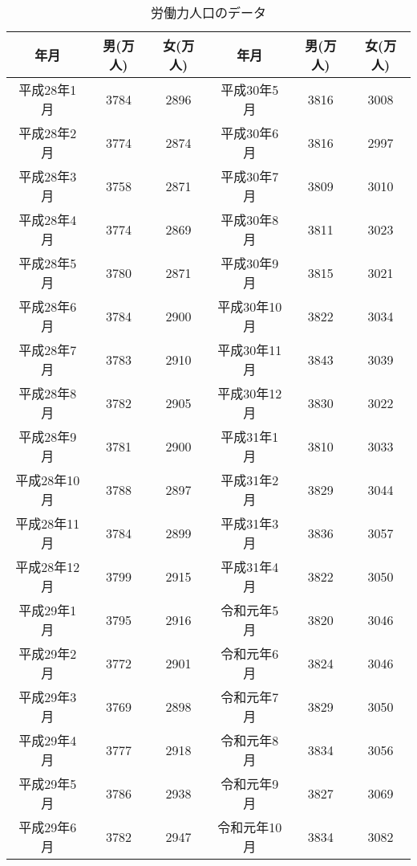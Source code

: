 \documentclass[12pt]{jarticle}
\begin{document}
\clearpage
\begin{table}[htb]
    \begin{center}
        \caption{労働力人口のデータ}
        \begin{tabular}{|c|c|c||c|c|c|} \hline
            年月         & 男(万人) & 女(万人) & 年月         & 男(万人) & 女(万人) \\\hline
            平成28年1月  & 3784     & 2896     & 平成30年5月  & 3816     & 3008     \\
            平成28年2月  & 3774     & 2874     & 平成30年6月  & 3816     & 2997     \\
            平成28年3月  & 3758     & 2871     & 平成30年7月  & 3809     & 3010     \\
            平成28年4月  & 3774     & 2869     & 平成30年8月  & 3811     & 3023     \\
            平成28年5月  & 3780     & 2871     & 平成30年9月  & 3815     & 3021     \\
            平成28年6月  & 3784     & 2900     & 平成30年10月 & 3822     & 3034     \\
            平成28年7月  & 3783     & 2910     & 平成30年11月 & 3843     & 3039     \\
            平成28年8月  & 3782     & 2905     & 平成30年12月 & 3830     & 3022     \\
            平成28年9月  & 3781     & 2900     & 平成31年1月  & 3810     & 3033     \\
            平成28年10月 & 3788     & 2897     & 平成31年2月  & 3829     & 3044     \\
            平成28年11月 & 3784     & 2899     & 平成31年3月  & 3836     & 3057     \\
            平成28年12月 & 3799     & 2915     & 平成31年4月  & 3822     & 3050     \\
            平成29年1月  & 3795     & 2916     & 令和元年5月  & 3820     & 3046     \\
            平成29年2月  & 3772     & 2901     & 令和元年6月  & 3824     & 3046     \\
            平成29年3月  & 3769     & 2898     & 令和元年7月  & 3829     & 3050     \\
            平成29年4月  & 3777     & 2918     & 令和元年8月  & 3834     & 3056     \\
            平成29年5月  & 3786     & 2938     & 令和元年9月  & 3827     & 3069     \\
            平成29年6月  & 3782     & 2947     & 令和元年10月 & 3834     & 3082     \\

\end{tabular}
\end{center}
\end{table}
\end{document}
